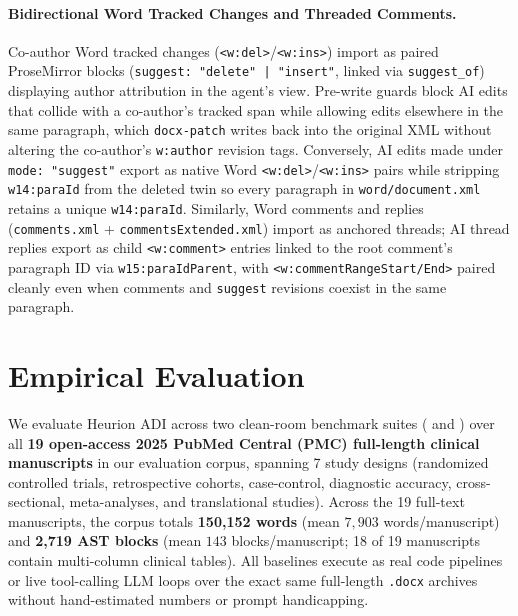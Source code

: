 \documentclass[11pt,a4paper]{article}
\begin{document}
\paragraph{Bidirectional Word Tracked Changes and Threaded Comments.}
Co-author Word tracked changes (\texttt{<w:del>}/\texttt{<w:ins>}) import as paired ProseMirror blocks (\texttt{suggest: "delete" | "insert"}, linked via \texttt{suggest\_of}) displaying author attribution in the agent's view. Pre-write guards block AI edits that collide with a co-author's tracked span while allowing edits elsewhere in the same paragraph, which \texttt{docx-patch} writes back into the original XML without altering the co-author's \texttt{w:author} revision tags. Conversely, AI edits made under \texttt{mode: "suggest"} export as native Word \texttt{<w:del>}/\texttt{<w:ins>} pairs while stripping \texttt{w14:paraId} from the deleted twin so every paragraph in \texttt{word/document.xml} retains a unique \texttt{w14:paraId}. Similarly, Word comments and replies (\texttt{comments.xml} + \texttt{commentsExtended.xml}) import as anchored threads; AI thread replies export as child \texttt{<w:comment>} entries linked to the root comment's paragraph ID via \texttt{w15:paraIdParent}, with \texttt{<w:commentRangeStart/End>} paired cleanly even when comments and \texttt{suggest} revisions coexist in the same paragraph.

\section{Empirical Evaluation}
\label{sec:evaluation}

We evaluate Heurion ADI across two clean-room benchmark suites ( and ) over all \textbf{19 open-access 2025 PubMed Central (PMC) full-length clinical manuscripts} in our evaluation corpus, spanning 7 study designs (randomized controlled trials, retrospective cohorts, case-control, diagnostic accuracy, cross-sectional, meta-analyses, and translational studies). Across the 19 full-text manuscripts, the corpus totals \textbf{150,152 words} (mean $7{,}903$ words/manuscript) and \textbf{2,719 AST blocks} (mean $143$ blocks/manuscript; 18 of 19 manuscripts contain multi-column clinical tables). All baselines execute as real code pipelines or live tool-calling LLM loops over the exact same full-length \texttt{.docx} archives without hand-estimated numbers or prompt handicapping.
\end{document}
